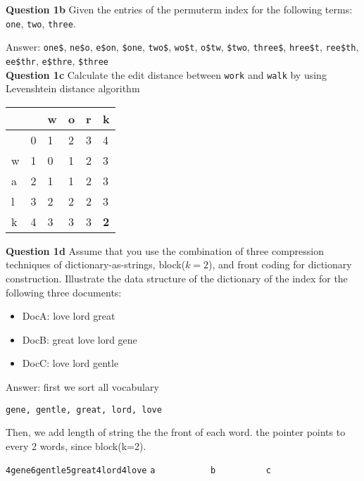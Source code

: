 \documentclass[11pt,a4paper]{report}
\begin{document}
\begin{multicols*}{2}
\noindent \textbf{Question 1b} Given the entries of the permuterm index for the following terms: \verb|one|, \verb|two|, \verb|three|.

\noindent Answer: \verb|one$|, \verb|ne$o|, \verb|e$on|, \verb|$one|, \verb|two$|, \verb|wo$t|, \verb|o$tw|, \verb|$two|, \verb|three$|, \verb|hree$t|, \verb|ree$th|, \verb|ee$thr|, \verb|e$thre|, \verb|$three|\\

\noindent \textbf{Question 1c} Calculate the edit distance between \verb|work| and \verb|walk| by using Levenshtein distance algorithm

\begin{center}
\begin{tabular}{ | l | l  l  l  l  l |} 
    \hline
      &   & w & o & r & k \\
    \hline
      & 0 & 1 & 2 & 3 & 4 \\
    w & 1 & 0 & 1 & 2 & 3 \\
    a & 2 & 1 & 1 & 2 & 3 \\
    l & 3 & 2 & 2 & 2 & 3 \\
    k & 4 & 3 & 3 & 3 & \textbf{2} \\
    \hline
\end{tabular}
\end{center}

\noindent \textbf{Question 1d} Assume that you use the combination of three compression techniques of dictionary-as-strings, block($k=2$), and front coding for dictionary construction. Illustrate the data structure of the dictionary of the index for the following three documents:
\begin{itemize}
    \item DocA: love lord great
    \item DocB: great love lord gene
    \item DocC: love lord gentle
\end{itemize}

\noindent Answer: first we sort all vocabulary

\begin{center}
\verb|gene, gentle, great, lord, love|
\end{center}

\noindent Then, we add length of string the the front of each word. the pointer points to every 2 words, since block(k=2).

\begin{center}

\verb|4gene6gentle5great4lord4love|
\verb|a           b          c    |
\end{center}


\end{multicols*}
\end{document}
